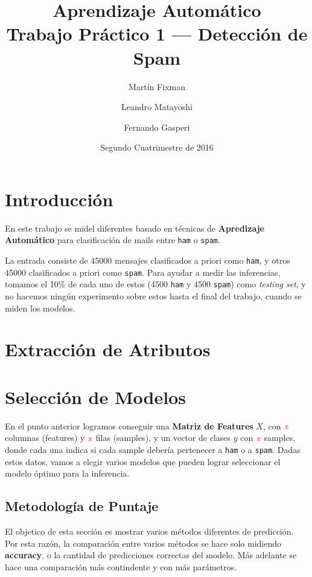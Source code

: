 \documentclass{article}
\title{Aprendizaje Automático \\ Trabajo Práctico 1 --- Detección de Spam}
\author{Martín Fixman \and Leandro Matayoshi \and Fernando Gasperi}
\date{Segundo Cuatrimestre de 2016}
\newcommand{\todox}{\(\mathit{\color{red}x}\)}
\newcommand{\ham}{\large{\texttt{ham}}}
\newcommand{\spam}{\large{\texttt{spam}}}
\begin{document}
\maketitle

\newpage

\section{Introducción}

En este trabajo se midel diferentes basado en técnicas de \textbf{Apredizaje Automático} para clasificación de mails entre \ham{} o \spam{}.

La entrada consiste de \num{45000} mensajes clasificados a priori como \ham{}, y otros \num{45000} clasificados a priori como \spam{}. Para ayudar a medir las inferencias, tomamos el 10\% de cada uno de estos (\num{4500} \ham{} y \num{4500} \spam{}) como \textit{testing set}, y no hacemos ningún experimento sobre estos hasta el final del trabajo, cuando se miden los modelos.

\section{Extracción de Atributos}



\section{Selección de Modelos}

En el punto anterior logramos conseguir una \textbf{Matriz de Features} \( X \), con \todox{} columnas (features) y \todox{} filas (samples), y un vector de clases \( y \) con \todox{} samples, donde cada una indica si cada sample debería pertenecer a \ham{} o a \spam{}. Dadas estos datos, vamos a elegir varios modelos que pueden lograr seleccionar el modelo óptimo para la inferencia.

\subsection{Metodología de Puntaje}

El objetico de esta sección es mostrar varios métodos diferentes de predicción. Por esta razón, la comparación entre varios métodos se hace solo midiendo \textbf{accuracy}, o la cantidad de predicciones correctas del modelo. Más adelante se hace una comparación más contindente y con más parámetros.
\end{document}
